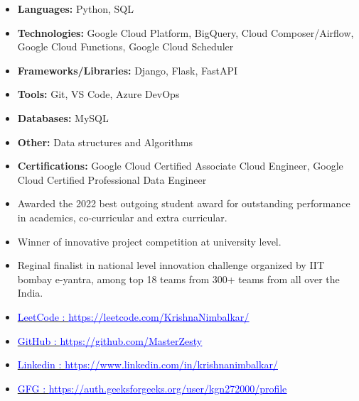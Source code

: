 \documentclass[10pt,a4paper,ragged2e]{altacv}
\begin{document}



\smallskip
\begin{itemize}
\item \textbf{Languages:} Python, SQL
\item \textbf{Technologies:} Google Cloud Platform, BigQuery, Cloud Composer/Airflow, Google Cloud Functions, Google Cloud Scheduler
\item \textbf{Frameworks/Libraries:} Django, Flask, FastAPI
\item \textbf{Tools:} Git, VS Code, Azure DevOps
\item \textbf{Databases:} MySQL
\item \textbf{Other:} Data structures and Algorithms
\item \textbf{Certifications:} Google Cloud Certified Associate Cloud Engineer, Google Cloud Certified Professional Data Engineer
\end{itemize}

\smallskip
\begin{itemize}
\item Awarded the 2022 best outgoing student award for outstanding performance in academics, co-curricular and extra
curricular.
\smallskip
\item Winner of innovative project competition at university level.
\smallskip
\item Reginal finalist in national level innovation challenge organized by IIT bombay e-yantra, among top 18 teams from
300+ teams from all over the India.
\end{itemize}

\smallskip
\begin{itemize}
\item {\href{https://leetcode.com/KrishnaNimbalkar/}{\textcolor{blue}{LeetCode : \underline{https://leetcode.com/KrishnaNimbalkar/ }}}}
\smallskip
\item {\href{https://github.com/MasterZesty}{\textcolor{blue}{GitHub : \underline{https://github.com/MasterZesty}}}}
\smallskip
\item {\href{https://www.linkedin.com/in/krishnanimbalkar/}{\textcolor{blue}{Linkedin : \underline{https://www.linkedin.com/in/krishnanimbalkar/}}}}
\item {\href{https://auth.geeksforgeeks.org/user/kgn272000/profile}{\textcolor{blue}{GFG : \underline{https://auth.geeksforgeeks.org/user/kgn272000/profile}}}}
\end{itemize}
\end{document}
